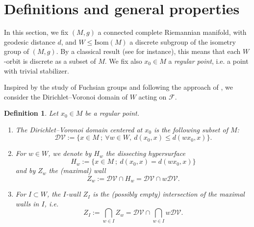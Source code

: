 \documentclass[11pt,twoside]{amsart}
\theoremstyle{plain}
\newtheorem{definition}[prop]{Definition}
\newcommand{\R}{{\mathbb R}}
\newcommand{\Sym}{\mathfrak{S}}
\begin{document}



\section{Definitions and general properties}

In this section, we fix $(M,g)$ a connected complete Riemannian manifold, with geodesic distance $d$, and $W\le\mathrm{Isom}(M)$ a discrete subgroup of the isometry group of $(M,g)$. By a classical result (see \cite[Lemma 2.1]{reflection_groups_on_manifolds} for instance), this means that each $W$-orbit is discrete as a subset of $M$. We fix also $x_0\in M$ a \emph{regular point}, i.e. a point with trivial stabilizer.

Inspired by the study of Fuchsian groups and following the approach of \cite{reflection_groups_on_manifolds}, we consider the Dirichlet--Voronoi domain of $W$ acting on $\mathcal{F}$.

\begin{definition}\label{dirichlet}
Let $x_0\in M$ be a regular point.
\begin{enumerate}[label=$\bullet$]
\item The \emph{Dirichlet--Voronoi domain} centered at $x_0$ is the following subset of $M$:
\[\mathcal{DV}:=\{x\in M~;~\forall w \in W,~d(x_0,x)\le d(wx_0,x)\}.\]
\item For $w\in W$, we denote by $H_w$ the \emph{dissecting hypersurface}
\[H_w:=\{x\in M~;~d(x_0,x)=d(wx_0,x)\}\]
and by $Z_w$ the (maximal) \emph{wall}
\[Z_w:=\mathcal{DV}\cap H_w=\mathcal{DV}\cap w\mathcal{DV}.\]
\item For $I\subset W$, the \emph{$I$-wall} $Z_I$ is the (possibly empty) intersection of the maximal walls in $I$, i.e.
\[Z_I:=\bigcap_{w\in I}Z_w=\mathcal{DV}\cap\bigcap_{w\in I}w\mathcal{DV}.\]
\end{enumerate}
\end{definition}
\end{document}
